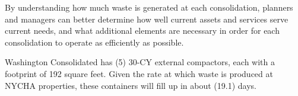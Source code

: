 
    By understanding how much waste is generated at each consolidation, planners and managers
    can better determine how well current assets and services serve current needs, and what additional 
    elements are necessary in order for each consolidation to operate as efficiently as possible. 

    Washington Consolidated has (5) 30-CY external compactors, each with a footprint of 192 square feet. Given the rate at which waste is produced at NYCHA properties, these containers will fill
    up in about (19.1) days.